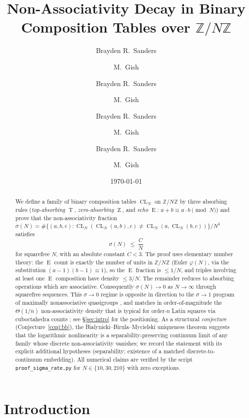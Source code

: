 \documentclass[11pt,reqno]{amsart}
\title[Non-associativity decay on \texorpdfstring{$\mathbb{Z}/N\mathbb{Z}$}{Z/NZ}]%
{Non-Associativity Decay in Binary Composition Tables over
$\mathbb{Z}/N\mathbb{Z}$}
\author{Brayden R.\ Sanders \and M.\ Gish}
\author{Brayden R.\ Sanders \and M.\ Gish}
\author{Brayden R.\ Sanders \and M.\ Gish}
\author{Brayden R.\ Sanders \and M.\ Gish}
\date{\today}
\theoremstyle{plain}
\theoremstyle{definition}
\theoremstyle{remark}
\DeclareMathOperator{\CL}{CL}
\DeclareMathOperator{\ECHO}{E}
\DeclareMathOperator{\HARM}{T}
\DeclareMathOperator{\VOID}{Z}
\newcommand{\ZN}{\mathbb{Z}/N\mathbb{Z}}
\begin{document}
\begin{abstract}
We define a family of binary composition tables $\CL_N$ on $\ZN$ by
three absorbing rules (\emph{top-absorbing} $\HARM$, \emph{zero-absorbing}
$\VOID$, and \emph{echo} $\ECHO$: $a+b\equiv a\cdot b\pmod N$) and
prove that the non-associativity fraction
$\sigma(N)=\#\{(a,b,c):\CL_N(\CL_N(a,b),c)\neq\CL_N(a,\CL_N(b,c))\}/N^3$
satisfies
\[
  \sigma(N)\;\le\;\frac{C}{N}
\]
for squarefree $N$, with an absolute constant $C<3$. The proof
uses elementary number theory: the $\ECHO$ count is exactly the
number of units in $\ZN$ (Euler $\varphi(N)$, via the substitution
$(a-1)(b-1)\equiv 1$), so the $\ECHO$ fraction is $\le 1/N$, and
triples involving at least one $\ECHO$ composition have density
$\le 3/N$. The remainder reduces to absorbing operations which are
associative. Consequently $\sigma(N)\to 0$ as $N\to\infty$ through
squarefree sequences. This $\sigma\to 0$ regime is opposite in
direction to the $\sigma\to 1$ program of maximally nonassociative
quasigroups \cite{DrapalWanless2021,DrapalLisonek2020}, and matches
in order-of-magnitude the $\Theta(1/n)$ non-associativity density
that is typical for order-$n$ Latin squares via cuboctahedra
counts \cite{KSSS2023}; see \S\ref{sec:intro} for the positioning.
As a structural \emph{conjecture} (Conjecture~\ref{conj:bb}), the
Bialynicki--Birula--Mycielski uniqueness theorem \cite{BB1976}
suggests that the logarithmic nonlinearity is a separability-preserving
continuum limit of any family whose discrete non-associativity vanishes;
we record the statement with its explicit additional hypotheses
(separability; existence of a matched discrete-to-continuum embedding).
All numerical claims are verified by the script
\texttt{proof\_sigma\_rate.py} for $N\in\{10,30,210\}$ with zero
exceptions.
\end{abstract}

\maketitle

\section{Introduction}\label{sec:intro}
\end{document}
